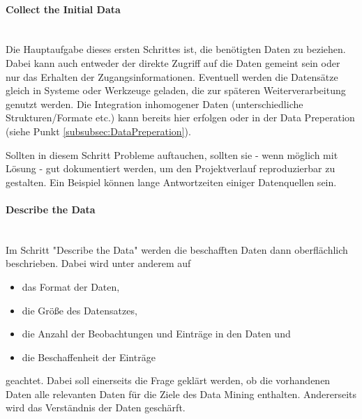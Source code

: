 \paragraph{Collect the Initial Data}\mbox{} \\
Die Hauptaufgabe dieses ersten Schrittes ist, die benötigten Daten zu beziehen. Dabei kann auch entweder der direkte Zugriff auf die Daten gemeint sein oder nur das Erhalten der Zugangsinformationen. Eventuell werden die Datensätze gleich in Systeme oder Werkzeuge geladen, die zur späteren Weiterverarbeitung genutzt werden. Die Integration inhomogener Daten (unterschiedliche Strukturen/Formate etc.) kann bereits hier erfolgen oder in der Data Preperation (siehe Punkt \ref{subsubsec:DataPreperation}). \citep[S.~18]{chapman_crisp-dm_2000}

Sollten in diesem Schritt Probleme auftauchen, sollten sie - wenn möglich mit Lösung - gut dokumentiert werden, um den Projektverlauf reproduzierbar zu gestalten. Ein Beispiel können lange Antwortzeiten einiger Datenquellen sein.\citep[S.~15]{shearer_crisp-dm_2000}

\paragraph{Describe the Data}\mbox{} \\
Im Schritt "Describe the Data" werden die beschafften Daten dann oberflächlich beschrieben.\citep[S.~18]{chapman_crisp-dm_2000} Dabei wird unter anderem auf 
\begin{itemize}
\item das Format der Daten,
\item die Größe des Datensatzes,
\item die Anzahl der Beobachtungen und Einträge in den Daten und 
\item die Beschaffenheit der Einträge
\end{itemize}
geachtet. Dabei soll einerseits die Frage geklärt werden, ob die vorhandenen Daten alle relevanten Daten für die Ziele des Data Mining enthalten. Andererseits wird das Verständnis der Daten geschärft.\citep[S.~15]{shearer_crisp-dm_2000}

